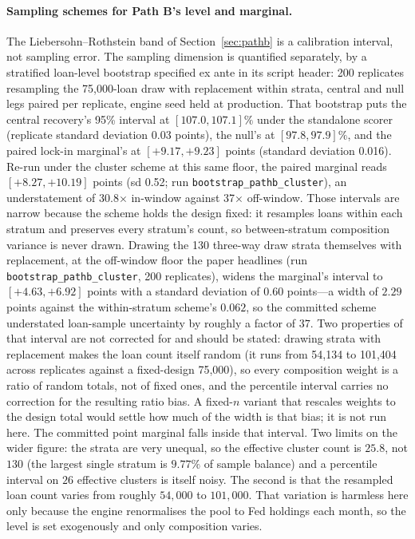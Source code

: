 \documentclass[12pt]{article}
\begin{document}
\paragraph{Sampling schemes for Path B's level and marginal.}
The Liebersohn--Rothstein band of Section~\ref{sec:pathb} is a calibration interval, not sampling error. The sampling dimension is quantified separately, by a stratified loan-level bootstrap specified ex ante in its script header: 200 replicates resampling the 75,000-loan draw with replacement within strata, central and null legs paired per replicate, engine seed held at production. That bootstrap puts the central recovery's 95\% interval at $[107.0, 107.1]\%$ under the standalone scorer (replicate standard deviation 0.03 points), the null's at $[97.8, 97.9]\%$, and the paired lock-in marginal's at $[+9.17, +9.23]$ points (standard deviation 0.016). Re-run under the cluster scheme at this same floor, the paired marginal reads $[+8.27, +10.19]$ points (sd 0.52; run \texttt{bootstrap\_pathb\_cluster}), an understatement of 30.8$\times$ in-window against 37$\times$ off-window. Those intervals are narrow because the scheme holds the design fixed: it resamples loans within each stratum and preserves every stratum's count, so between-stratum composition variance is never drawn. Drawing the 130 three-way draw strata themselves with replacement, at the off-window floor the paper headlines (run \texttt{bootstrap\_pathb\_cluster}, 200 replicates), widens the marginal's interval to $[+4.63, +6.92]$ points with a standard deviation of $0.60$ points---a width of $2.29$ points against the within-stratum scheme's $0.062$, so the committed scheme understated loan-sample uncertainty by roughly a factor of $37$. Two properties of that interval are not corrected for and should be stated: drawing strata with replacement makes the loan count itself random (it runs from 54,134 to 101,404 across replicates against a fixed-design 75,000), so every composition weight is a ratio of random totals, not of fixed ones, and the percentile interval carries no correction for the resulting ratio bias. A fixed-$n$ variant that rescales weights to the design total would settle how much of the width is that bias; it is not run here. The committed point marginal falls inside that interval. Two limits on the wider figure: the strata are very unequal, so the effective cluster count is $25.8$, not $130$ (the largest single stratum is $9.77\%$ of sample balance) and a percentile interval on $26$ effective clusters is itself noisy. The second is that the resampled loan count varies from roughly $54{,}000$ to $101{,}000$. That variation is harmless here only because the engine renormalises the pool to Fed holdings each month, so the level is set exogenously and only composition varies.
\end{document}
